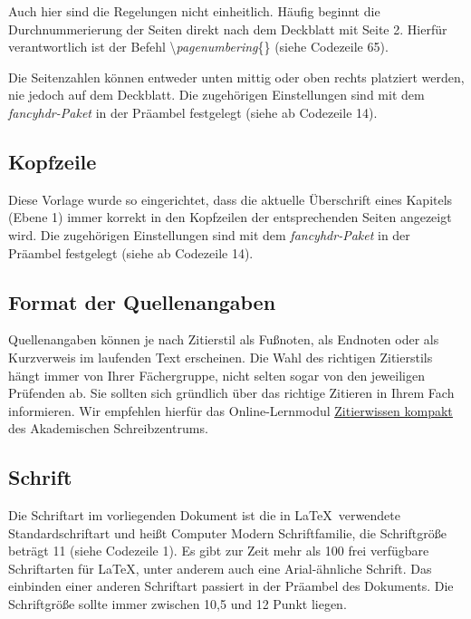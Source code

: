 \documentclass[a4paper,11pt]{article}%
\renewcommand{\\}{\vspace*{0.5\baselineskip} \newline}
\begin{document}
Auch hier sind die Regelungen nicht einheitlich. Häufig beginnt die Durchnummerierung der Seiten direkt nach dem Deckblatt mit Seite 2. Hierfür verantwortlich ist der Befehl \textbackslash\textit{pagenumbering}\{\} (siehe Codezeile 65).\\

Die Seitenzahlen können entweder unten mittig oder oben rechts platziert werden, nie jedoch auf dem Deckblatt. Die zugehörigen Einstellungen sind mit dem \textit{fancyhdr-Paket} in der Präambel festgelegt (siehe ab Codezeile 14).



\subsection{Kopfzeile}

Diese Vorlage wurde so eingerichtet, dass die aktuelle Überschrift eines Kapitels (Ebene 1) immer korrekt in den Kopfzeilen der entsprechenden Seiten angezeigt wird. Die zugehörigen Einstellungen sind mit dem \textit{fancyhdr-Paket} in der Präambel festgelegt (siehe ab Codezeile 14).



\subsection{Format der Quellenangaben}

Quellenangaben können je nach Zitierstil als Fußnoten, als Endnoten oder als Kurzverweis im laufenden Text erscheinen. Die Wahl des richtigen Zitierstils hängt immer von Ihrer Fächergruppe, nicht selten sogar von den jeweiligen Prüfenden ab. Sie sollten sich gründlich über das richtige Zitieren in Ihrem Fach informieren. Wir empfehlen hierfür das Online-Lernmodul \href{https://ilias.th-koeln.de/ilias.php?baseClass=ilRepositoryGUI}{\underline{Zitierwissen kompakt}} des Akademischen Schreibzentrums.



\subsection{Schrift}

Die Schriftart im vorliegenden Dokument ist die in \LaTeX~verwendete Standardschriftart und heißt Computer Modern Schriftfamilie, die Schriftgröße beträgt 11 (siehe Codezeile 1). Es gibt zur Zeit mehr als 100 frei verfügbare Schriftarten für \LaTeX, unter anderem auch eine Arial-ähnliche Schrift. Das einbinden einer anderen Schriftart passiert in der Präambel des Dokuments. Die Schriftgröße sollte immer zwischen 10,5 und 12 Punkt liegen. \\
\end{document}
